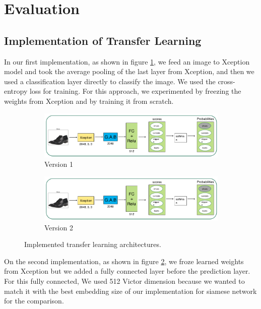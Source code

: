 \section{Evaluation}

\subsection{Implementation of Transfer Learning}
In our first implementation, as shown in figure \ref {fig:xceptiona}, we feed an image to Xception model and took the average pooling of the last layer from Xception, and then we used a classification layer directly to classify the image. We used the cross-entropy loss for training. For this approach, we experimented by freezing the weights from Xception and by training it from scratch. 

\begin{figure}[h]
 \centering
  \begin{subfigure}[b]{\linewidth}
 \includegraphics[width=\linewidth]{figs/xception_1.png}
  \caption{Version 1}
  \label{fig:xceptiona}
  \end{subfigure}
    \hfill
  \begin{subfigure}[b]{\linewidth}
 \includegraphics[width=\linewidth]{figs/xception_1.png}
 \caption{Version 2}
  \label{fig:xceptionb}
  \end{subfigure}
    \hfill    
 \caption{Implemented transfer learning architectures.}
 \label{fig:xception}
\end{figure}

On the second implementation, as shown in figure \ref{fig:xceptionb}, we froze learned weights from Xception but we added a fully connected layer before the prediction layer. For this fully connected, We used 512 Victor dimension because we wanted to match it with the best embedding size of our implementation for siamese network for the comparison. 


